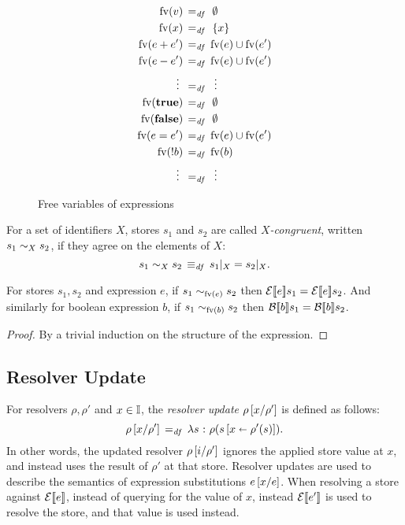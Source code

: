 \documentclass[11pt]{report}
\begin{document}
\begin{figure}[h]
	\centering
	\begin{align*}
		\mathrm{fv}(v) \operatorname{\;=_{\mathit{df}}\;} {} & \operatorname{\emptyset} \\ 
		\mathrm{fv}(x) \operatorname{\;=_{\mathit{df}}\;} {} & \left\lbrace x \right\rbrace \\
		\mathrm{fv}(e + e') \operatorname{\;=_{\mathit{df}}\;} {} & \mathrm{fv}(e) \cup \mathrm{fv}(e') \\
		\mathrm{fv}(e - e') \operatorname{\;=_{\mathit{df}}\;} {} & \mathrm{fv}(e) \cup \mathrm{fv}(e') \\
		\vdots~ \operatorname{\;=_{\mathit{df}}\;} {} & ~\vdots \\
		\mathrm{fv}(\mathbf{true}) \operatorname{\;=_{\mathit{df}}\;} {} & \operatorname{\emptyset} \\
		\mathrm{fv}(\mathbf{false}) \operatorname{\;=_{\mathit{df}}\;} {} & \operatorname{\emptyset} \\
		\mathrm{fv}(e = e') \operatorname{\;=_{\mathit{df}}\;} {} & \mathrm{fv}(e) \cup \mathrm{fv}(e') \\
		\mathrm{fv}(!b) \operatorname{\;=_{\mathit{df}}\;} {} & \mathrm{fv}(b) \\
		\vdots~ \operatorname{\;=_{\mathit{df}}\;} {} & ~\vdots
	\end{align*}
	\caption{Free variables of expressions}
	\label{fig:expfv}
\end{figure}

For a set of identifiers $X$, stores $s_1$ and $s_2$ are called \emph{$X$-congruent}, written $s_1 \sim_{X} s_2$, if they agree on the elements of $X$: \[ s_1 \sim_{X} s_2 \operatorname{\;\equiv_{\mathit{df}}\;} s_1 |_{X} = s_2 |_{X}. \]

\begin{lemma}
	\label{lem:expr-fv}
	For stores $s_1,s_2$ and expression $e$, if $s_1 \sim_{\mathrm{fv}(e)} s_2$ then $\mathcal{E}[\![e]\!]s_1 = \mathcal{E}[\![e]\!]s_2$. And similarly for boolean expression $b$, if $s_1 \sim_{\mathrm{fv}(b)} s_2$ then $\mathcal{B}[\![b]\!]s_1 = \mathcal{B}[\![b]\!]s_2$. 
\end{lemma}

\begin{proof}
	By a trivial induction on the structure of the expression.
\end{proof}


\subsection{Resolver Update} %
\label{sub:resolver_update}

For resolvers $\rho,\rho'$ and $x \in \mathbb{I}$, the \emph{resolver update} $\rho\left[x / \rho'\right]$ is defined as follows: \[ \rho\left[x / \rho'\right] \operatorname{\;=_{\mathit{df}}\;} \lambda s \operatorname{\,:\,} \rho(s \left[ x \shortleftarrow \rho'(s) \right]). \] In other words, the updated resolver $\rho \left[i / \rho'\right]$ ignores the applied store value at $x$, and instead uses the result of $\rho'$ at that store. Resolver updates are used to describe the semantics of expression substitutions $e \left[x / e\right]$. When resolving a store against $\mathcal{E}[\![e]\!]$, instead of querying for the value of $x$, instead $\mathcal{E}[\![e']\!]$ is used to resolve the store, and that value is used instead. 
\end{document}
